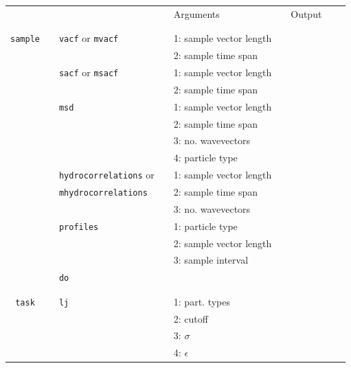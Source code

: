 \documentclass[11pt]{article}
\begin{document}
\begin{center}
  
  \begin{tabular}{cclclclll}
    {\color{red}{\textbf{Action}}} && {\color{blue}{Specifier}} && Arguments && Output \\
                                   && && && \\
    \hline
                                   && && && \\

    \verb!sample! && \verb!vacf! or \verb!mvacf! &&  1: sample vector length && \\
    $\mbox{}$   && &&  2: sample time span && \\
    $\mbox{}$   && \verb!sacf! or \verb!msacf! &&1: sample vector length && \\
    $\mbox{}$   &&                   &&  2: sample time span && \\
    $\mbox{}$   && \verb!msd! && 1: sample vector length && \\
    $\mbox{}$   &&            &&  2: sample time span && \\
    $\mbox{}$   &&            &&  3: no. wavevectors && \\
    $\mbox{}$   &&            &&  4: particle type && \\
    $\mbox{}$   && \verb!hydrocorrelations! or && 1: sample vector length && \\
    $\mbox{}$   && \verb!mhydrocorrelations!  &&  2: sample time span && \\
    $\mbox{}$   &&            &&  3: no. wavevectors && \\
    $\mbox{}$   && \verb!profiles! &&1: particle type && \\
    $\mbox{}$   &&                   &&  2: sample vector length && \\
    $\mbox{}$   &&                   &&  3: sample interval && \\
    $\mbox{}$   && \verb!do!         &&  && \\
                                   && && && \\
    \hline
                                   && && && \\
    \verb!task! && \verb!lj!       && 1: part. types && \\
                                   && && 2: cutoff&& \\
                                   && && 3: $\sigma$ && \\
                                   && && 4: $\epsilon$ && \\

\end{tabular}
\end{center}
\end{document}
